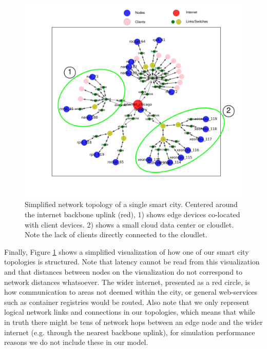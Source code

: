 \begin{figure}
    \centering
    \includegraphics[width=\linewidth]{graphics/diagrams/tiny_topo.png}
    \caption{Simplified network topology of a single smart city. Centered around the internet backbone uplink (red), 1) shows edge devices co-located with client devices. 2) shows a small cloud data center or cloudlet. Note the lack of clients directly connected to the cloudlet.}
    \label{fig:tiny_topo}
\end{figure}

Finally, Figure \ref{fig:tiny_topo} shows a simplified visualization of how one of our smart city topologies is structured.
Note that latency cannot be read from this visualization and that distances between nodes on the visualization do not correspond to network distances whatsoever.
The wider internet, presented as a red circle, is how communication to areas not deemed within the city, or general web-services such as container registries would be routed.
Also note that we only represent logical network links and connections in our topologies, which means that while in truth there might be tens of network hops between an edge node and the wider internet (e.g. through the nearest backbone uplink), for simulation performance reasons we do not include these in our model.